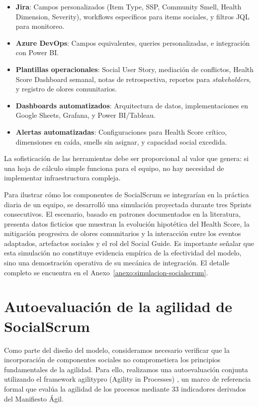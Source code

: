 \begin{itemize}
    \item \textbf{Jira}: Campos personalizados (Item Type, SSP, Community Smell, Health Dimension, Severity), workflows específicos para items sociales, y filtros JQL para monitoreo.
    \item \textbf{Azure DevOps}: Campos equivalentes, queries personalizadas, e integración con Power BI.
    \item \textbf{Plantillas operacionales}: Social User Story, mediación de conflictos, Health Score Dashboard semanal, notas de retrospectiva, reportes para \textit{stakeholders}, y registro de olores comunitarios.
    \item \textbf{Dashboards automatizados}: Arquitectura de datos, implementaciones en Google Sheets, Grafana, y Power BI/Tableau.
    \item \textbf{Alertas automatizadas}: Configuraciones para Health Score crítico, dimensiones en caída, smells sin asignar, y capacidad social excedida.
\end{itemize}

La sofisticación de las herramientas debe ser proporcional al valor que genera: si una hoja de cálculo simple funciona para el equipo, no hay necesidad de implementar infraestructura compleja.

Para ilustrar cómo los componentes de SocialScrum se integrarían en la práctica diaria de un equipo, se desarrolló una simulación proyectada durante tres Sprints consecutivos. El escenario, basado en patrones documentados en la literatura, presenta datos ficticios que muestran la evolución hipotética del Health Score, la mitigación progresiva de olores comunitarios y la interacción entre los eventos adaptados, artefactos sociales y el rol del Social Guide. Es importante señalar que esta simulación no constituye evidencia empírica de la efectividad del modelo, sino una demostración operativa de su mecánica de integración. El detalle completo se encuentra en el Anexo~\ref{anexo:simulacion-socialscrum}.

\section{Autoevaluación de la agilidad de SocialScrum}
\label{sec:autoevaluacion-agilidad}

Como parte del diseño del modelo, consideramos necesario verificar que la incorporación de componentes sociales no comprometiera los principios fundamentales de la agilidad. Para ello, realizamos una autoevaluación conjunta utilizando el framework \gls{agilitypro} (Agility in Processes) \cite{ortega2019agilityevaluation}, un marco de referencia formal que evalúa la agilidad de los procesos mediante 33 indicadores derivados del Manifiesto Ágil.

